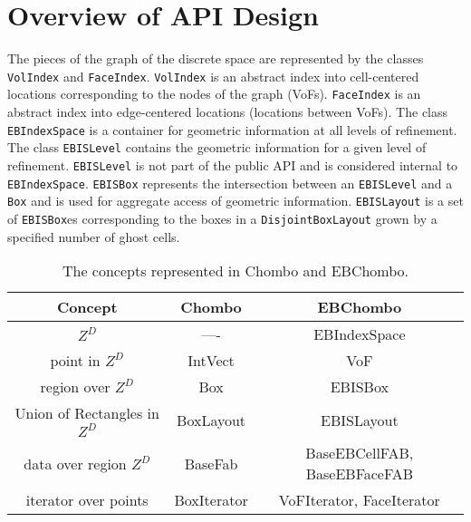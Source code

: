 
\section{Overview of API Design}
\label{sec::overview}

The pieces of the graph of the discrete space are represented by the
classes {\tt VolIndex} and {\tt FaceIndex}.   {\tt VolIndex} is an
abstract index into cell-centered locations corresponding to the nodes
of the graph (VoFs).   {\tt FaceIndex} is an abstract index into
edge-centered locations (locations between VoFs). The class {\tt
EBIndexSpace} is a container for geometric information at all levels
of refinement. The class {\tt EBISLevel} contains the geometric
information for a given level of refinement.  {\tt EBISLevel} is not
part of the public API and is considered internal to {\tt
EBIndexSpace}.  {\tt EBISBox} represents the intersection between an
{\tt EBISLevel} and a {\tt Box} and is used for aggregate access of
geometric information.   {\tt EBISLayout} is a set of {\tt EBISBox}es
corresponding to the boxes in a {\tt DisjointBoxLayout} grown by a
specified number of ghost cells. 

\begin{table}
\begin{center}
\begin{tabular}{|c||c|c|} 
\hline
Concept & Chombo & EBChombo 
\\ \hline\hline
$Z^D$             &  ----   & EBIndexSpace
\\
point in $Z^D$    & IntVect & VoF 
\\
region over $Z^D$ & Box     & EBISBox
\\
Union of Rectangles in $Z^D$ & BoxLayout     & EBISLayout
\\
data over region $Z^D$ & BaseFab & BaseEBCellFAB, BaseEBFaceFAB
\\ 
iterator over points & BoxIterator & VoFIterator, FaceIterator
\\ 
\hline                                                 
\end{tabular}
\end{center}
\caption{The concepts represented in Chombo and EBChombo.}
\label{fig::concepts}
\end{table}


